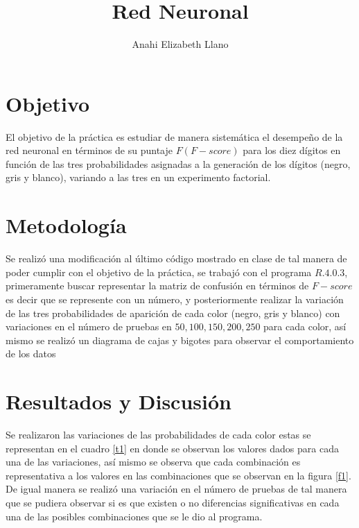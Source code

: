 \documentclass{article}
\begin{document}
\title{\textbf{Red Neuronal}}
\author{Anahi Elizabeth Llano}

\maketitle

\section{Objetivo}\label{obj}

El objetivo de la pr\'actica es \cite{elisa} estudiar de manera sistem\'atica el desempe\~no de la red neuronal en t\'erminos de su puntaje $F (F-score)$ para los diez d\'igitos en funci\'on de las tres probabilidades asignadas a la generaci\'on de los d\'igitos (negro, gris y blanco), variando a las tres en un experimento factorial.

\section{Metodolog\'{i}a}\label{met}

Se realiz\'o una modificaci\'on al \'ultimo c\'odigo mostrado en clase de tal manera de poder cumplir con el objetivo de la pr\'actica, se trabaj\'o con el programa $R.4.0.3$, primeramente buscar representar la matriz de confusi\'on en t\'erminos de $F-score$ \cite{elisadisc} es decir que se represente con un n\'umero, y posteriormente realizar la variaci\'on de las tres probabilidades de aparici\'on de cada color (negro, gris y blanco) con variaciones en el n\'umero de pruebas en $50, 100, 150, 200, 250$ para cada color, as\'i mismo se realiz\'o un diagrama de cajas y bigotes \cite{ana} para observar el comportamiento de los datos


\section{Resultados y Discusi\'{o}n}\label{res}

Se realizaron las variaciones de las probabilidades de cada color estas se representan en el cuadro \ref{t1} en donde se observan los valores dados para cada una de las variaciones, as\'i mismo se observa que cada combinaci\'on es representativa a los valores en las combinaciones que se observan en la figura \ref{f1}.
De igual manera se realiz\'o una variaci\'on en el n\'umero de pruebas de tal manera que se pudiera observar si es que existen o no diferencias significativas en cada una de las posibles combinaciones que se le dio al programa.
\end{document}
